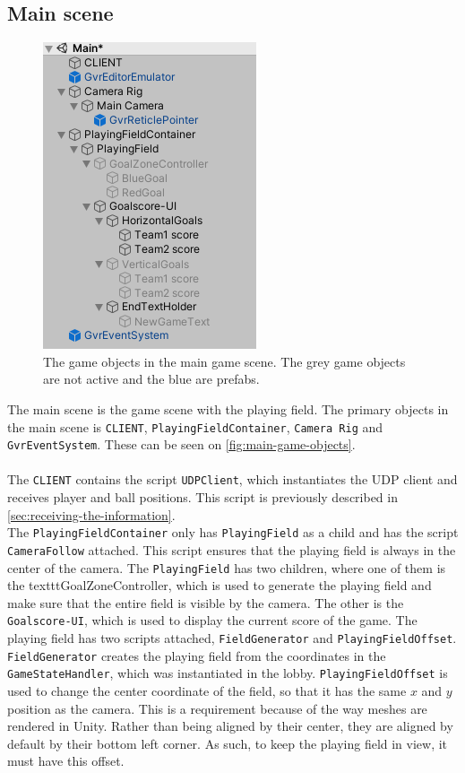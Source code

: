 \subsection{Main scene}
\begin{figure}[H]
    \centering
    \includegraphics[width=0.4\linewidth]{figures/unity-main-gameobjects.PNG}
    \caption{The game objects in the main game scene. The grey game objects are not active and the blue are prefabs.}
    \label{fig:main-game-objects}
\end{figure}
The main scene is the game scene with the playing field.
The primary objects in the main scene is \texttt{CLIENT}, \texttt{PlayingFieldContainer}, \texttt{Camera Rig} and \texttt{GvrEventSystem}.
These can be seen on \autoref{fig:main-game-objects}.
\\\\
The \texttt{CLIENT} contains the script \texttt{UDPClient}, which instantiates the UDP client and receives player and ball positions.
This script is previously described in \autoref{sec:receiving-the-information}.
\\
The \texttt{PlayingFieldContainer} only has \texttt{PlayingField} as a child and has the script \texttt{CameraFollow} attached.
This script ensures that the playing field is always in the center of the camera.
The \texttt{PlayingField} has two children, where one of them is the texttt{GoalZoneController}, which is used to generate the playing field and make sure that the entire field is visible by the camera.
The other is the \texttt{Goalscore-UI}, which is used to display the current score of the game.
The playing field has two scripts attached, \texttt{FieldGenerator} and \texttt{PlayingFieldOffset}.
\texttt{FieldGenerator} creates the playing field from the coordinates in the \texttt{GameStateHandler}, which was instantiated in the lobby.
\texttt{PlayingFieldOffset} is used to change the center coordinate of the field, so that it has the same $x$ and $y$ position as the camera.
This is a requirement because of the way meshes are rendered in Unity.
Rather than being aligned by their center, they are aligned by default by their bottom left corner.
As such, to keep the playing field in view, it must have this offset.
